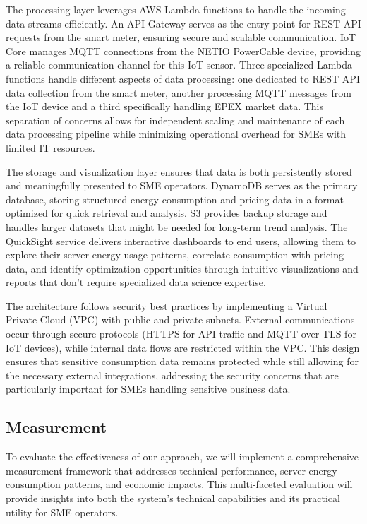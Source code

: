 The processing layer leverages AWS Lambda functions to handle the incoming data streams
efficiently. An API Gateway serves as the entry point for REST API requests from the smart meter,
ensuring secure and scalable communication. IoT Core manages MQTT connections from the NETIO
PowerCable device, providing a reliable communication channel for this IoT sensor.
Three specialized Lambda functions handle different aspects of data processing: one dedicated to
REST API data collection from the smart meter, another processing MQTT messages from the IoT device
and a third specifically handling EPEX market data. This separation of concerns allows for
independent scaling and maintenance of each data processing pipeline while minimizing operational
overhead for SMEs with limited IT resources.

The storage and visualization layer ensures that data is both persistently stored and meaningfully
presented to SME operators. DynamoDB serves as the primary database, storing structured energy
consumption and pricing data in a format optimized for quick retrieval and analysis. S3 provides
backup storage and handles larger datasets that might be needed for long-term trend analysis. The
QuickSight service delivers interactive dashboards to end users, allowing them to explore their
server energy usage patterns, correlate consumption with pricing data, and identify optimization
opportunities through intuitive visualizations and reports that don't require specialized data
science expertise.

The architecture follows security best practices by implementing a Virtual Private Cloud (VPC) with
public and private subnets. External communications occur through secure protocols
(HTTPS for API traffic and MQTT over TLS for IoT devices), while internal data flows are restricted
within the VPC. This design ensures that sensitive consumption data remains protected while still
allowing for the necessary external integrations, addressing the security concerns that are
particularly important for SMEs handling sensitive business data.

\subsection{Measurement}
To evaluate the effectiveness of our approach, we will implement a comprehensive measurement
framework that addresses technical performance, server energy consumption patterns, and economic
impacts. This multi-faceted evaluation will provide insights into both the system's technical
capabilities and its practical utility for SME operators.

